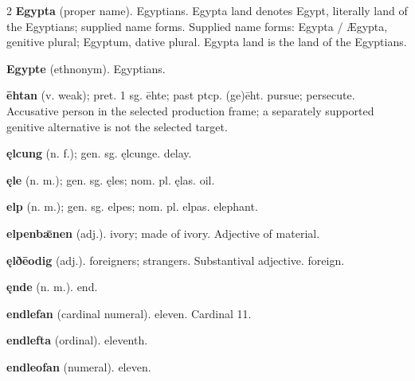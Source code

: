 \begin{multicols*}{2}
\textbf{Egypta} (proper name). Egyptians. Egypta land denotes Egypt, literally land of the Egyptians; supplied name forms. Supplied name forms: Egypta / Ægypta, genitive plural; Egyptum, dative plural. Egypta land is the land of the Egyptians.\par
\textbf{Egypte} (ethnonym). Egyptians.\par
\textbf{ēhtan} (v. weak); pret. 1 sg. ēhte; past ptcp. (ge)ēht. pursue; persecute. Accusative person in the selected production frame; a separately supported genitive alternative is not the selected target.\par
\textbf{ęlcung} (n. f.); gen. sg. ęlcunge. delay.\par
\textbf{ęle} (n. m.); gen. sg. ęles; nom. pl. ęlas. oil.\par
\textbf{elp} (n. m.); gen. sg. elpes; nom. pl. elpas. elephant.\par
\textbf{elpenbǣnen} (adj.). ivory; made of ivory. Adjective of material.\par
\textbf{ęlðēodig} (adj.). foreigners; strangers. Substantival adjective. foreign.\par
\textbf{ęnde} (n. m.). end.\par
\textbf{endlefan} (cardinal numeral). eleven. Cardinal 11.\par
\textbf{endlefta} (ordinal). eleventh.\par
\textbf{endleofan} (numeral). eleven.\par

\end{multicols*}
